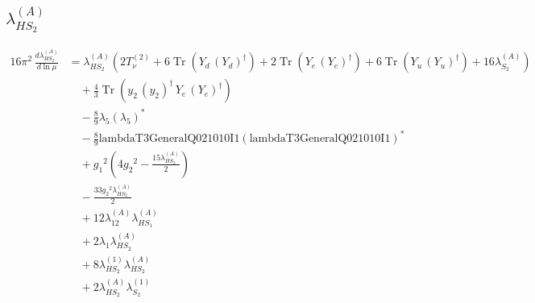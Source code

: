 \documentclass[10pt,a4paper]{article}
\begin{document}
\subsection*{$\lambda_{HS_2}^{(A)}$}
\begin{align*}
16\pi^2\,\frac{d \lambda_{HS_2}^{(A)}}{d\ln\mu} &={\lambda_{HS_2}^{(A)}} (2 T_{\nu}^{(2)}+6 \operatorname{Tr}\!\left({Y_d}\,\left({Y_d}\right)^{\dagger}\right)+2 \operatorname{Tr}\!\left({Y_e}\,\left({Y_e}\right)^{\dagger}\right)+6 \operatorname{Tr}\!\left({Y_u}\,\left({Y_u}\right)^{\dagger}\right)+16 {\lambda_{S_2}^{(A)}}) \\
&\quad +\frac{4}{3} \operatorname{Tr}\!\left({y_2}\,\left({y_2}\right)^{\dagger}\,{Y_e}\,\left({Y_e}\right)^{\dagger}\right) \\
&\quad -\frac{8}{9} {\lambda_5} \left({\lambda_5}\right)^{*} \\
&\quad -\frac{8}{9} \text{lambdaT3GeneralQ021010I1} \left(\text{lambdaT3GeneralQ021010I1}\right)^{*} \\
&\quad +{g_1}^2 \left(4 {g_2}^2-\frac{15 {\lambda_{HS_2}^{(A)}}}{2}\right) \\
&\quad -\frac{33 {g_2}^2 {\lambda_{HS_2}^{(A)}}}{2} \\
&\quad +12 {\lambda_{12}^{(A)}} {\lambda_{HS_1}^{(A)}} \\
&\quad +2 {\lambda_1} {\lambda_{HS_2}^{(A)}} \\
&\quad +8 {\lambda_{HS_2}^{(1)}} {\lambda_{HS_2}^{(A)}} \\
&\quad +2 {\lambda_{HS_2}^{(A)}} {\lambda_{S_2}^{(1)}} \\
\end{align*}
\end{document}
